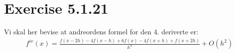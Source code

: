  
\section*{Exercise 5.1.21}
\label{sec:oppgave21}

Vi skal her bevise at andreordens formel for den 4. deriverte er: 
\begin{align}
{f^{iv}}(x) = \frac{{f(x - 2h) - 4f(x - h) + 6f(x) - 4f(x + h) + f(x + 2h)}}{{{h^4}}} + O({h^2}) \label{eq21:proove}
\end{align}